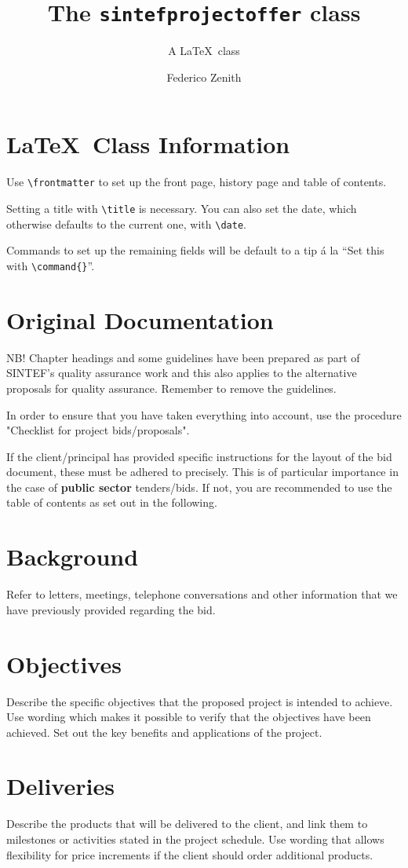 \documentclass[unrestricted]{sintefprojectoffer}
\title{The \texttt{sintefprojectoffer} class}
\subtitle{A \LaTeX\ class}
\author{Federico Zenith}
\begin{document}
\frontmatter

\section*{\LaTeX\ Class Information}
Use \verb|\frontmatter| to set up the front page, history page and
table of contents.

Setting a title with \verb|\title| is necessary.
You can also set the date, which otherwise defaults to the current one,
with \verb|\date|.

Commands to set up the remaining fields will be default to a tip
\'a la ``\textsf{Set this with }\verb|\command{}|''.

\section*{Original Documentation}
NB! Chapter headings and some guidelines have been prepared as part
of SINTEF's quality assurance work and this also applies to the
alternative proposals for quality assurance.
Remember to remove the guidelines.


In order to ensure that you have taken everything into account, use
the procedure "Checklist for project bids/proposals".

If the client/principal has provided specific instructions for the layout
of the bid document, these must be adhered to precisely.
This is of particular importance in the case of \textbf{public sector}
tenders/bids.
If not, you are recommended to use the table of contents as set out in
the following.


\section{Background}
Refer to letters, meetings, telephone conversations and other information
that we have previously provided regarding the bid.

\section{Objectives}
Describe the specific objectives that the proposed project is intended
to achieve.
Use wording which makes it possible to verify that the objectives have
been achieved.
Set out the key benefits and applications of the project.

\section{Deliveries}
Describe the products that will be delivered to the client, and link them
to milestones or activities stated in the project schedule.
Use wording that allows flexibility for price increments if the client
should order additional products.
\end{document}
